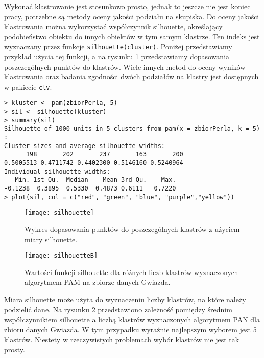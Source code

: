 \documentclass[polish,]{book}
\begin{document}
Wykonać klastrowanie jest stosunkowo prosto, jednak to jeszcze nie jest koniec
pracy, potrzebne są metody oceny jakości podziału na skupiska. Do oceny jakości
klastrowania można wykorzystać współczynnik silhouette, określający podobieństwo
obiektu do innych obiektów w tym samym klastrze. Ten indeks jest wyznaczany przez
funkcje \texttt{silhouette(cluster)}. Poniżej przedstawiamy przykład użycia tej funkcji,
a na rysunku \ref{fig:silhouette} przedstawiamy dopasowania poszczególnych punktów do klastrów.
Wiele innych metod do oceny wyników klastrowania oraz badania zgodności dwóch
podziałów na klastry jest dostępnych w pakiecie \texttt{clv}.

\begin{verbatim}
> kluster <- pam(zbiorPerla, 5)
> sil <- silhouette(kluster)
> summary(sil)
Silhouette of 1000 units in 5 clusters from pam(x = zbiorPerla, k = 5) :
Cluster sizes and average silhouette widths:
      198       202       237       163       200
0.5005513 0.4711742 0.4402300 0.5146160 0.5240964
Individual silhouette widths:
   Min. 1st Qu.  Median    Mean 3rd Qu.    Max.
-0.1238  0.3895  0.5330  0.4873 0.6111   0.7220
> plot(sil, col = c("red", "green", "blue", "purple","yellow"))
\end{verbatim}

\begin{figure}

{\centering \texttt{[image: silhouette]} 

}

\caption{Wykres dopasowania punktów do poszczególnych klastrów z użyciem miary silhouette.}\label{fig:silhouette}
\end{figure}
\begin{figure}

{\centering \texttt{[image: silhouetteB]} 

}

\caption{Wartości funkcji silhouette dla różnych liczb klastrów wyznaczonych algorytmem PAM na zbiorze danych Gwiazda.}\label{fig:silhouetteB}
\end{figure}

Miara silhouette może użyta do wyznaczeniu liczby klastrów, na które należy
podzielić dane. Na rysunku \ref{fig:silhouetteB} przedstawiono zależność pomiędzy średnim współczynnikiem silhouette a liczbą klastrów wyznaczonych algorytmem PAN dla zbioru danych Gwiazda. W tym przypadku wyraźnie najlepszym wyborem jest 5 klastrów. Niestety w rzeczywistych problemach wybór klastrów nie jest tak prosty.
\end{document}

